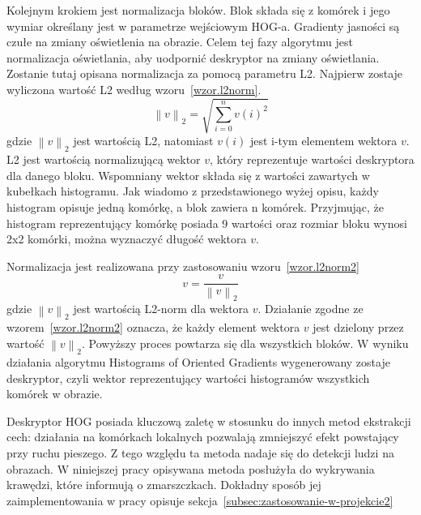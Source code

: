 \documentclass[a4paper,twoside,12pt]{book}
\begin{document}
    Kolejnym krokiem jest normalizacja bloków. Blok składa się z komórek i jego wymiar określany jest w parametrze
    wejściowym HOG-a.
    Gradienty jasności są czułe na zmiany oświetlenia na obrazie. Celem tej fazy algorytmu jest normalizacja oświetlania,
    aby uodpornić deskryptor na zmiany oświetlania.
    Zostanie tutaj opisana normalizacja za pomocą parametru L2.
    Najpierw zostaje wyliczona wartość L2 według wzoru~\ref{wzor.l2norm}.
    \large
    \begin{equation}
        \left \|v  \right \|_{2}=\sqrt{\sum_{i=0}^{n}v(i)^{2}}
        \label{wzor.l2norm}
    \end{equation}
    \normalsize
    gdzie $\left \|v  \right \|_{2}$ jest wartością L2, natomiast $v(i)$ jest i-tym elementem wektora $v$.
    L2 jest wartością normalizującą wektor $v$, który reprezentuje
    wartości
    deskryptora dla danego bloku. Wspomniany wektor składa się z wartości zawartych w kubełkach histogramu. Jak
    wiadomo z
    przedstawionego wyżej opisu, każdy histogram opisuje jedną komórkę, a blok zawiera n komórek.
    Przyjmując, że histogram reprezentujący komórkę posiada 9 wartości oraz rozmiar bloku
    wynosi 2x2 komórki, można wyznaczyć długość wektora $v$.  %

    Normalizacja jest realizowana przy zastosowaniu wzoru~\ref{wzor.l2norm2}
    \large
    \begin{equation}
        v = \frac{v}{\left \|v  \right \|_{2}}
        \label{wzor.l2norm2}
    \end{equation}
    \normalsize
    gdzie $\left \|v  \right \|_{2}$ jest wartością L2-norm dla wektora $v$. Działanie zgodne ze
    wzorem~\ref{wzor.l2norm2} oznacza, że każdy element wektora $v$ jest dzielony przez wartość
    $\left \|v  \right\|_{2}$.
    Powyższy proces powtarza się dla wszystkich bloków.
    W wyniku działania algorytmu Histograms of Oriented Gradients wygenerowany zostaje deskryptor, czyli wektor
    reprezentujący wartości histogramów wszystkich komórek w obrazie.

    Deskryptor HOG posiada kluczową zaletę w stosunku do innych metod ekstrakcji cech:
    działania na komórkach lokalnych pozwalają zmniejszyć efekt powstający przy ruchu pieszego.
    Z tego względu ta metoda nadaje się do detekcji ludzi na obrazach.
    W niniejszej pracy opisywana metoda posłużyła do wykrywania krawędzi, które informują o zmarszczkach.
    Dokładny sposób jej
    zaimplementowania w pracy opisuje sekcja~\ref{subsec:zastosowanie-w-projekcie2}
\end{document}
